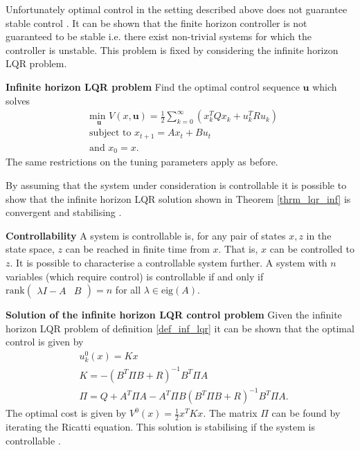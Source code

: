 Unfortunately optimal control in the setting described above does not guarantee stable control \cite{raw}. It can be shown that the finite horizon controller is not guaranteed to be stable i.e. there exist non-trivial systems for which the controller is unstable. This problem is fixed by considering the infinite horizon LQR problem. 
\begin{defn}
\textbf{Infinite horizon LQR problem} Find the optimal control sequence $\mathbf{u}$ which solves
\begin{equation}
\begin{aligned}
&\underset{\mathbf{u}}{\text{min }} V(x, \mathbf{u}) = \frac{1}{2}\sum_{k=0}^{\infty} \left( x_k^TQx_k + u_k^TRu_k \right) \\
&\text{subject to } x_{t+1} = Ax_t+Bu_t \\
&\text{and } x_0 = x.
\end{aligned}
\label{eq_inf_lqr_problem}
\end{equation}
The same restrictions on the tuning parameters apply as before.
\label{def_inf_lqr}
\end{defn}
By assuming that the system under consideration is controllable it is possible to show that the infinite horizon LQR solution shown in Theorem \ref{thrm_lqr_inf} is convergent and stabilising \cite{raw}.
\begin{defn}
\textbf{Controllability} A system is controllable is, for any pair of states $x,z$ in the state space, $z$ can be reached in finite time from $x$. That is, $x$ can be controlled to $z$. It is possible to characterise a controllable system further. A system with $n$ variables (which require control) is controllable if and only if $\text{rank}\begin{pmatrix}
\lambda I- A & B
\end{pmatrix} = n$ for all $\lambda \in \text{eig}(A)$. 
\end{defn}
\begin{thrm}
\textbf{Solution of the infinite horizon LQR control problem} Given the infinite horizon LQR problem of definition \ref{def_inf_lqr} it can be shown that the optimal control is given by
\begin{equation}
\begin{aligned}
&u^0_{k}(x) = Kx \\
&K = -(B^T\Pi B+R)^{-1}B^T\Pi A \\
&\Pi = Q + A^T\Pi A-A^T\Pi B(B^T\Pi B+R)^{-1}B^T\Pi A.  
\end{aligned}
\label{eq_lqr_inf_opt_control}
\end{equation}
The optimal cost is given by $V^0(x) = \frac{1}{2}x^TKx$. The matrix $\Pi$ can be found by iterating the Ricatti equation. This solution is stabilising if the system is controllable \cite{raw}.
\label{thrm_lqr_inf}
\end{thrm}

